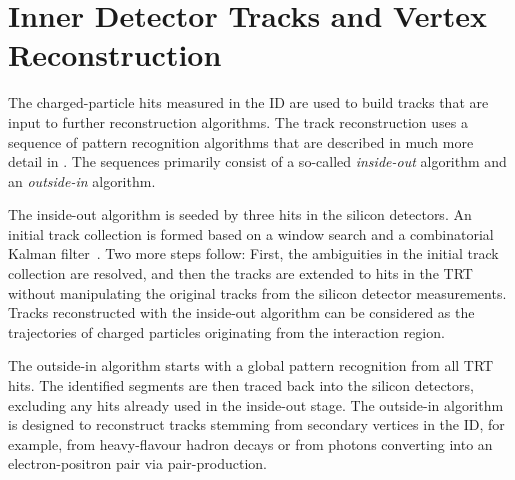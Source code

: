

\section{Inner Detector Tracks and Vertex Reconstruction}
The charged-particle hits measured in the ID are used to build tracks that are input to further reconstruction algorithms.
The track reconstruction uses a sequence of pattern recognition algorithms that are described in much more detail in . The sequences primarily consist of a so-called \emph{inside-out} algorithm and an \emph{outside-in} algorithm.

The inside-out algorithm is seeded by three hits in the silicon detectors. An initial track collection is formed based on a window search and a combinatorial Kalman filter~\cite{fruhwirth_application_1987}. Two more steps follow: First, the ambiguities in the initial track collection are resolved, and then the tracks are extended to hits in the TRT without manipulating the original tracks from the silicon detector measurements. Tracks reconstructed with the inside-out algorithm can be considered as the trajectories of charged particles originating from the interaction region.

The outside-in algorithm starts with a global pattern recognition from all TRT hits. The identified segments are then traced back into the silicon detectors, excluding any hits already used in the inside-out stage. The outside-in algorithm is designed to reconstruct tracks stemming from secondary vertices in the ID, for example, from heavy-flavour hadron decays or from photons converting into an electron-positron pair via pair-production.

